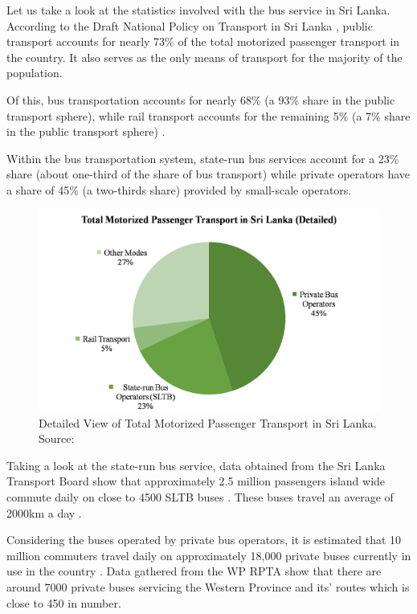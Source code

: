 \documentclass[12pt, oneside]{report}
\begin{document}
Let us take a look at the statistics involved with the bus service in Sri Lanka. According to the Draft National Policy on Transport in Sri Lanka \citep{MinistryofTransport2008}, public transport accounts for nearly 73\% of the total motorized passenger transport in the country. It also serves as the only means of transport for the majority of the population.

Of this, bus transportation accounts for nearly 68\% (a 93\% share in the public transport sphere), while rail transport accounts for the remaining 5\% (a 7\% share in the public transport sphere) \citep{MinistryofTransport2008}.

Within the bus transportation system, state-run bus services account for a 23\% share (about one-third of the share of bus transport) while private operators have a share of 45\% (a two-thirds share) provided by small-scale operators.

\begin {figure} [h!]
\centering
\includegraphics [scale=0.6] {totalMotorTransportPieChart}
\caption [Total Motorized Passenger Transport in SL] {Detailed View of Total Motorized Passenger Transport in Sri Lanka. Source: \citep{MinistryofTransport2008}}
\label {image-totalMotorTransportPieChart}
\end {figure}

Taking a look at the state-run bus service, data obtained from the Sri Lanka Transport Board show that approximately 2.5 million passengers island wide commute daily on close to 4500 SLTB buses \citep{SriLankaTransportBoard2010}. These buses travel an average of 2000km a day \citep{SriLankaTransportBoard2012}. 

Considering the buses operated by private bus operators, it is estimated that 10 million commuters travel daily on approximately 18,000 private buses currently in use in the country \citep{Silva2010}. Data gathered from the WP RPTA show that there are around 7000 private buses servicing the Western Province and its’ routes which is close to 450 in number. 
\end{document}
